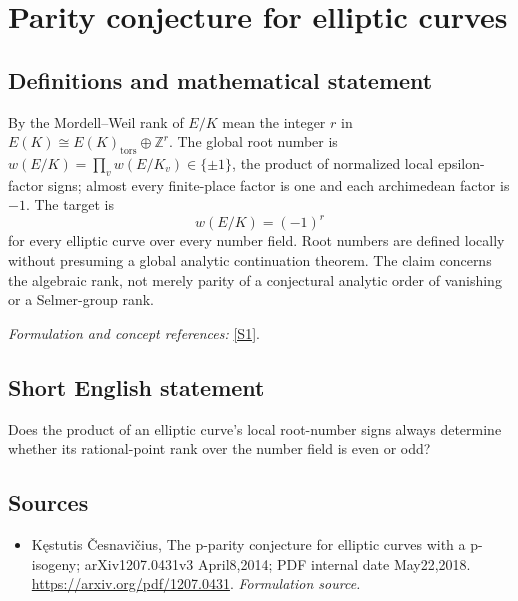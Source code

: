 \documentclass[11pt]{article}
\begin{document}
\section*{\texorpdfstring{Parity conjecture for elliptic curves}{Parity conjecture for elliptic curves}}\label{196}
\subsection{Definitions and mathematical statement}
By the Mordell--Weil rank of $E/K$ mean the integer $r$ in
$E(K)\cong E(K)_{\mathrm{tors}}\oplus{\mathbb{Z}}^r$. The global root number is
$w(E/K)=\prod_v w(E/K_v)\in\{\pm1\}$, the product of normalized local epsilon-factor signs; almost every finite-place factor is one and each archimedean factor is $-1$. The target is
\[
 w(E/K)=(-1)^r
\]
for every elliptic curve over every number field. Root numbers are defined locally without presuming a global analytic continuation theorem. The claim concerns the algebraic rank, not merely parity of a conjectural analytic order of vanishing or a Selmer-group rank.
\par\smallskip\textit{Formulation and concept references:} \href{https://arxiv.org/pdf/1207.0431}{[S1]}.

\subsection{Short English statement}
Does the product of an elliptic curve's local root-number signs always determine whether its rational-point rank over the number field is even or odd?
\subsection{Sources}
\begin{itemize}
\item[S1]Kęstutis Česnavičius, The p-parity conjecture for elliptic curves with a p-isogeny; arXiv1207.0431v3 April8,2014; PDF internal date May22,2018.
\url{https://arxiv.org/pdf/1207.0431}.
\textit{Formulation source.}
\end{itemize}
\end{document}
